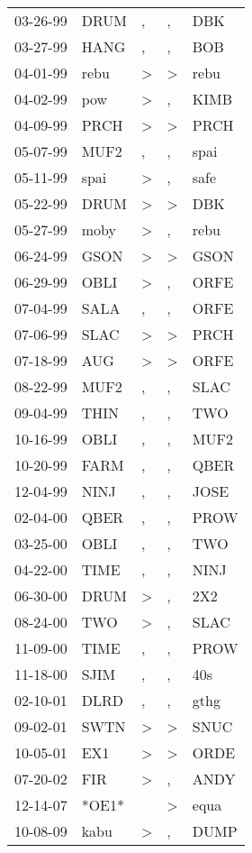 \begin{supertabular}{lllll}
 03-26-99 &   DRUM &             , &             , &   DBK \\
 03-27-99 &   HANG &             , &             , &   BOB \\
 04-01-99 &   rebu &  \textgreater &  \textgreater &  rebu \\
 04-02-99 &    pow &  \textgreater &             , &  KIMB \\
 04-09-99 &   PRCH &  \textgreater &  \textgreater &  PRCH \\
 05-07-99 &   MUF2 &             , &             , &  spai \\
 05-11-99 &   spai &  \textgreater &             , &  safe \\
 05-22-99 &   DRUM &  \textgreater &  \textgreater &   DBK \\
 05-27-99 &   moby &  \textgreater &             , &  rebu \\
 06-24-99 &   GSON &  \textgreater &  \textgreater &  GSON \\
 06-29-99 &   OBLI &  \textgreater &             , &  ORFE \\
 07-04-99 &   SALA &             , &             , &  ORFE \\
 07-06-99 &   SLAC &  \textgreater &  \textgreater &  PRCH \\
 07-18-99 &    AUG &  \textgreater &  \textgreater &  ORFE \\
 08-22-99 &   MUF2 &             , &             , &  SLAC \\
 09-04-99 &   THIN &             , &             , &   TWO \\
 10-16-99 &   OBLI &             , &             , &  MUF2 \\
 10-20-99 &   FARM &             , &             , &  QBER \\
 12-04-99 &   NINJ &             , &             , &  JOSE \\
 02-04-00 &   QBER &             , &             , &  PROW \\
 03-25-00 &   OBLI &             , &             , &   TWO \\
 04-22-00 &   TIME &             , &             , &  NINJ \\
 06-30-00 &   DRUM &  \textgreater &             , &   2X2 \\
 08-24-00 &    TWO &  \textgreater &             , &  SLAC \\
 11-09-00 &   TIME &             , &             , &  PROW \\
 11-18-00 &   SJIM &             , &             , &   40s \\
 02-10-01 &   DLRD &             , &             , &  gthg \\
 09-02-01 &   SWTN &  \textgreater &  \textgreater &  SNUC \\
 10-05-01 &    EX1 &  \textgreater &  \textgreater &  ORDE \\
 07-20-02 &    FIR &  \textgreater &             , &  ANDY \\
 12-14-07 &  *OE1* &               &  \textgreater &  equa \\
 10-08-09 &   kabu &  \textgreater &             , &  DUMP \\
\end{supertabular}
